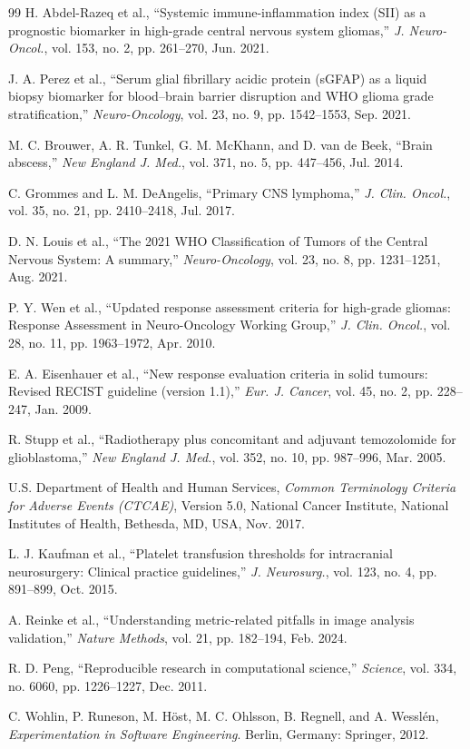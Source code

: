 \documentclass[conference]{IEEEtran}
\begin{document}
\begin{thebibliography}{99}
H. Abdel-Razeq et al., ``Systemic immune-inflammation index (SII) as a prognostic biomarker in high-grade central nervous system gliomas,'' \textit{J. Neuro-Oncol.}, vol. 153, no. 2, pp. 261--270, Jun. 2021.

J. A. Perez et al., ``Serum glial fibrillary acidic protein (sGFAP) as a liquid biopsy biomarker for blood--brain barrier disruption and WHO glioma grade stratification,'' \textit{Neuro-Oncology}, vol. 23, no. 9, pp. 1542--1553, Sep. 2021.

M. C. Brouwer, A. R. Tunkel, G. M. McKhann, and D. van de Beek, ``Brain abscess,'' \textit{New England J. Med.}, vol. 371, no. 5, pp. 447--456, Jul. 2014.

C. Grommes and L. M. DeAngelis, ``Primary CNS lymphoma,'' \textit{J. Clin. Oncol.}, vol. 35, no. 21, pp. 2410--2418, Jul. 2017.

D. N. Louis et al., ``The 2021 WHO Classification of Tumors of the Central Nervous System: A summary,'' \textit{Neuro-Oncology}, vol. 23, no. 8, pp. 1231--1251, Aug. 2021.

P. Y. Wen et al., ``Updated response assessment criteria for high-grade gliomas: Response Assessment in Neuro-Oncology Working Group,'' \textit{J. Clin. Oncol.}, vol. 28, no. 11, pp. 1963--1972, Apr. 2010.

E. A. Eisenhauer et al., ``New response evaluation criteria in solid tumours: Revised RECIST guideline (version 1.1),'' \textit{Eur. J. Cancer}, vol. 45, no. 2, pp. 228--247, Jan. 2009.

R. Stupp et al., ``Radiotherapy plus concomitant and adjuvant temozolomide for glioblastoma,'' \textit{New England J. Med.}, vol. 352, no. 10, pp. 987--996, Mar. 2005.

U.S. Department of Health and Human Services, \textit{Common Terminology Criteria for Adverse Events (CTCAE)}, Version 5.0, National Cancer Institute, National Institutes of Health, Bethesda, MD, USA, Nov. 2017.

L. J. Kaufman et al., ``Platelet transfusion thresholds for intracranial neurosurgery: Clinical practice guidelines,'' \textit{J. Neurosurg.}, vol. 123, no. 4, pp. 891--899, Oct. 2015.

A. Reinke et al., ``Understanding metric-related pitfalls in image analysis validation,'' \textit{Nature Methods}, vol. 21, pp. 182--194, Feb. 2024.

R. D. Peng, ``Reproducible research in computational science,'' \textit{Science}, vol. 334, no. 6060, pp. 1226--1227, Dec. 2011.

C. Wohlin, P. Runeson, M. H\"{o}st, M. C. Ohlsson, B. Regnell, and A. Wessl\'{e}n, \textit{Experimentation in Software Engineering}. Berlin, Germany: Springer, 2012.

\end{thebibliography}
\end{document}

